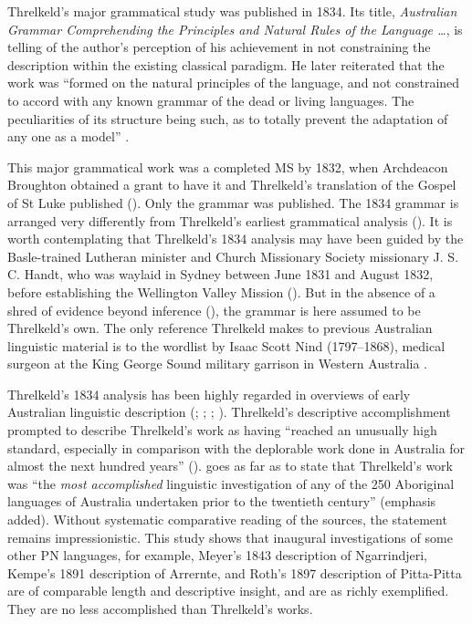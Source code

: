 Threlkeld’s major grammatical study was published in 1834. Its title, \textit{Australian Grammar Comprehending the Principles and Natural Rules of the Language …}, is telling of the author’s perception of his achievement in not constraining the description within the existing classical paradigm. He later reiterated that the work was “formed on the natural principles of the language, and not constrained to accord with any known grammar of the dead or living languages. The peculiarities of its structure being such, as to totally prevent the adaptation of any one as a model” \citep[x]{threlkeld_australian_1834}. 

This major grammatical work was a completed MS by 1832, when Archdeacon Broughton obtained a grant to have it and Threlkeld’s translation of the Gospel of St Luke published (\citealt[277]{bridges_church_1978}). Only the grammar was published. The 1834 grammar is arranged very differently from Threlkeld’s earliest grammatical analysis (\citealt{threlkeld_specimens_1927}). It is worth contemplating that Threlkeld’s 1834 analysis may have been guided by the Basle-trained Lutheran minister and Church Missionary Society missionary J. S. C. Handt, who was waylaid in Sydney between June 1831 and August 1832, before establishing the Wellington Valley Mission (). But in the absence of a shred of evidence beyond inference (), the grammar is here assumed to be Threlkeld’s own. The only reference Threlkeld makes to previous Australian linguistic material is to the wordlist by Isaac Scott Nind (1797–1868), medical surgeon at the King George Sound military garrison in Western Australia \citep{nind_description_1831}.

Threlkeld’s 1834 analysis has been highly regarded in overviews of early Australian linguistic description (\citealt[2]{ray_aboriginal_1925}; \citealt[664]{capell_history_1970}; \citealt[14]{wurm_languages_1972}; \citealt[165]{newton_more_1987}). Threlkeld’s descriptive accomplishment prompted \citet[264]{capell_history_1970} to describe Threlkeld’s work as having “reached an unusually high standard, especially in comparison with the deplorable work done in Australia for almost the next hundred years” (\citeyear[664]{capell_history_1970}). \citet[253]{carey_lancelot_2004} goes as far as to state that Threlkeld’s work was “the \textit{most accomplished} linguistic investigation of any of the 250 Aboriginal languages of Australia undertaken prior to the twentieth century” (emphasis added). Without systematic comparative reading of the sources, the statement remains impressionistic. This study shows that inaugural investigations of some other PN languages, for example, Meyer’s 1843 description of Ngarrindjeri, Kempe’s 1891 description of Arrernte, and Roth’s 1897 description of Pitta-Pitta are of comparable length and descriptive insight, and are as richly exemplified. They are no less accomplished than Threlkeld’s works. 

